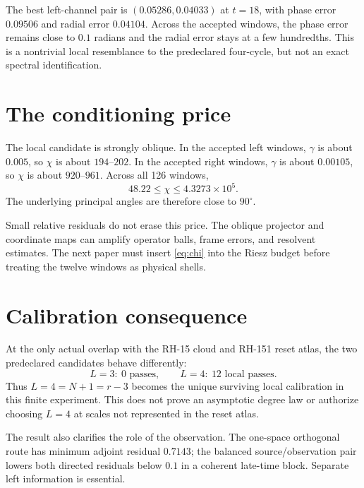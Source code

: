 \documentclass[12pt]{article}
\theoremstyle{remark}
\begin{document}
The best left-channel pair is
$(0.05286,0.04033)$ at $t=18$, with phase error $0.09506$ and radial error
$0.04104$.  Across the accepted windows, the phase error remains close to
$0.1$ radians and the radial error stays at a few hundredths.  This is a
nontrivial local resemblance to the predeclared four-cycle, but not an exact
spectral identification.

\section{The conditioning price}

The local candidate is strongly oblique.  In the accepted left windows,
$\gamma$ is about $0.005$, so $\chi$ is about $194$--$202$.  In the accepted
right windows, $\gamma$ is about $0.00105$, so $\chi$ is about $920$--$961$.
Across all 126 windows,
\begin{equation}\label{eq:conditioning-range}
 48.22\le\chi\le4.3273\times10^5.
\end{equation}
The underlying principal angles are therefore close to $90^\circ$.

Small relative residuals do not erase this price.  The oblique projector and
coordinate maps can amplify operator balls, frame errors, and resolvent
estimates.  The next paper must insert \eqref{eq:chi} into the Riesz budget
before treating the twelve windows as physical shells.

\section{Calibration consequence}

At the only actual overlap with the RH-15 cloud and RH-151 reset atlas, the
two predeclared candidates behave differently:
\begin{equation}\label{eq:calibration-choice}
 L=3:\ 0\text{ passes},
 \qquad
 L=4:\ 12\text{ local passes}.
\end{equation}
Thus $L=4=N+1=r-3$ becomes the unique surviving local calibration in this
finite experiment.  This does not prove an asymptotic degree law or authorize
choosing $L=4$ at scales not represented in the reset atlas.

The result also clarifies the role of the observation.  The one-space
orthogonal route has minimum adjoint residual $0.7143$; the balanced
source/observation pair lowers both directed residuals below $0.1$ in a
coherent late-time block.  Separate left information is essential.
\end{document}
